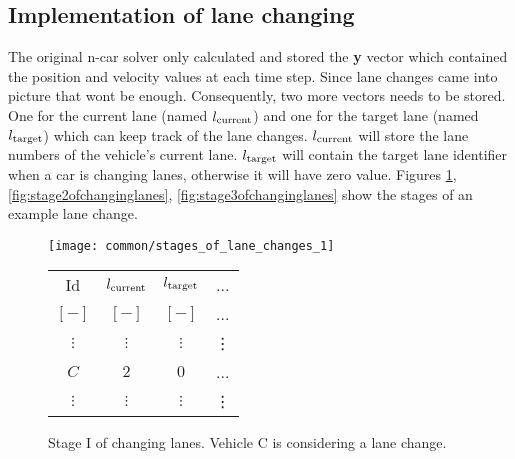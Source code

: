 		\subsection*{Implementation of lane changing}
		The original n-car solver only calculated and stored the \textbf{y} vector which contained the position and velocity values at each time step. Since lane changes came into picture that wont be enough. Consequently, two more vectors needs to be stored. One for the current lane (named $l_{\rm current}$) and one for the target lane (named $l_{\rm target}$) which can keep track of the lane changes. $l_{\rm current}$ will store the lane numbers of the vehicle's current lane. $l_{\rm target}$ will contain the target lane identifier when a car is changing lanes, otherwise it will have zero value. Figures \ref{fig:stage1ofchanginglanes}, \ref{fig:stage2ofchanginglanes}, \ref{fig:stage3ofchanginglanes} show the stages of an example lane change.
		\begin{figure}
			\begin{center}
				\begin{minipage}{.65\textwidth}
					\texttt{[image: common/stages\_of\_lane\_changes\_1]}
				\end{minipage}\quad
				\begin{minipage}{.3\textwidth}
					\begin{tabular}{ |c|c|c|c| }
						\hline
						Id & $l_{\rm current}$ & $l_{\rm target}$ & ... \\
						$[-]$ & $[-]$ & $[-]$ & ...\\
						\hline
						$\vdots$ & $\vdots$ & $\vdots$ & \vdots\\
						$C$ & $2$ & $0$ & ...\\
						$\vdots$ & $\vdots$ & $\vdots$ & \vdots\\
						\hline
					\end{tabular}
				\end{minipage}
			\end{center}
			\caption{Stage I of changing lanes. Vehicle C is considering a lane change.}
			\label{fig:stage1ofchanginglanes}
		\end{figure}
